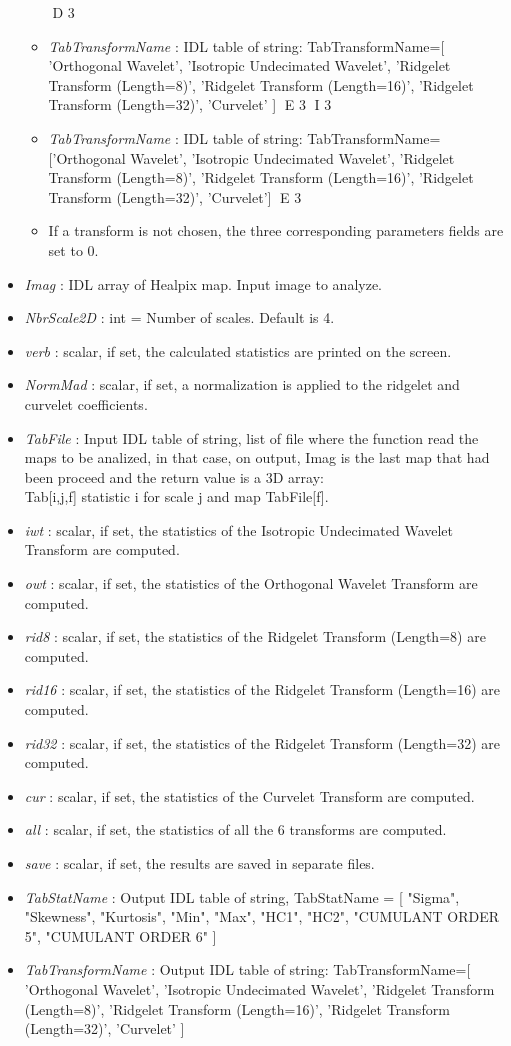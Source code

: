 \begin{itemize}
\begin{itemize}
D 3
\item {\em TabTransformName} : IDL table of string: TabTransformName=[ 'Orthogonal Wavelet', 'Isotropic Undecimated Wavelet', 'Ridgelet Transform (Length=8)', 
'Ridgelet Transform (Length=16)', 'Ridgelet Transform (Length=32)', 'Curvelet' ]
E 3
I 3
\item {\em TabTransformName} : IDL table of string: TabTransformName=['Orthogonal Wavelet', 'Isotropic Undecimated Wavelet', 'Ridgelet Transform (Length=8)', 
'Ridgelet Transform (Length=16)', 'Ridgelet Transform (Length=32)', 'Curvelet']
E 3
\item If a transform is not chosen, the three corresponding parameters fields are set to 0.
\end{itemize}
\item {\em Imag} : IDL array of Healpix map. Input image to analyze. 
\item {\em NbrScale2D} : int = Number of scales. Default is 4.  
\item {\em verb} : scalar, if set, the calculated statistics are printed on the screen.
\item {\em NormMad} : scalar, if set, a normalization is applied to the ridgelet and curvelet coefficients.
\item {\em TabFile} : Input IDL table of string, list of file where the function read the maps to be analized, in that case, on output, 
Imag is the last map that had been proceed and the return value is a 3D array:\\
Tab[i,j,f] \qquad statistic i for scale j and map TabFile[f].
\item {\em iwt} : scalar, if set, the statistics of the Isotropic Undecimated Wavelet Transform are computed.
\item {\em owt} : scalar, if set, the statistics of the Orthogonal Wavelet Transform are computed.
\item {\em rid8} : scalar, if set, the statistics of the Ridgelet Transform (Length=8) are computed.
\item {\em rid16} : scalar, if set, the statistics of the Ridgelet Transform (Length=16) are computed.
\item {\em rid32} : scalar, if set, the statistics of the Ridgelet Transform (Length=32) are computed.
\item {\em cur} : scalar, if set, the statistics of the Curvelet Transform are computed.
\item {\em all} : scalar, if set, the statistics of all the 6 transforms are computed.
\item {\em save} : scalar, if set, the results are saved in separate files.
\item {\em TabStatName} : Output IDL table of string, TabStatName = [ "Sigma", "Skewness", "Kurtosis", "Min", "Max", "HC1", "HC2", "CUMULANT ORDER 5", "CUMULANT ORDER 6" ]
\item {\em TabTransformName} : Output IDL table of string: 
TabTransformName=[ 'Orthogonal Wavelet', 'Isotropic Undecimated Wavelet', 'Ridgelet Transform (Length=8)', 'Ridgelet Transform (Length=16)', 'Ridgelet Transform (Length=32)', 'Curvelet' ]
\end{itemize}

